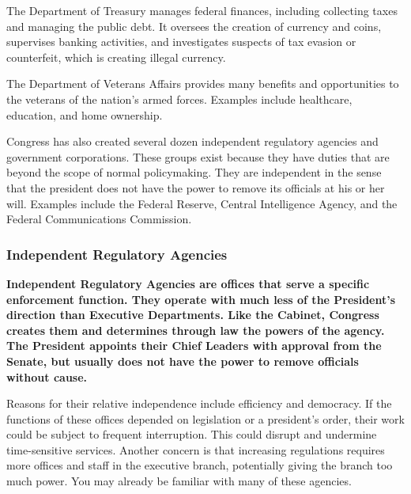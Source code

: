 \begin{definition}
    The Department of Treasury manages federal finances, including collecting
    taxes and managing the public debt. It oversees the creation of currency and
    coins, supervises banking activities, and investigates suspects of tax
    evasion or counterfeit, which is creating illegal currency.
\end{definition}

\begin{definition}
    The Department of Veterans Affairs provides many benefits and opportunities
    to the veterans of the nation's armed forces. Examples include healthcare,
    education, and home ownership.
\end{definition}

\begin{definition}
    Congress has also created several dozen independent regulatory agencies and
    government corporations. These groups exist because they have duties that
    are beyond the scope of normal policymaking. They are independent in the
    sense that the president does not have the power to remove its officials at
    his or her will. Examples include the Federal Reserve, Central Intelligence
    Agency, and the Federal Communications Commission.
\end{definition}

\subsubsection*{Independent Regulatory Agencies}

\bf{Independent Regulatory Agencies} are offices that serve a specific
enforcement function. They operate with much less of the \bf{President's}
direction than \bf{Executive Departments}. Like the \bf{Cabinet}, \bf{Congress}
creates them and determines through law the powers of the agency. The
\bf{President} appoints their \bf{Chief Leaders} with approval from the
\bf{Senate}, but usually does not have the power to remove officials without
cause.

Reasons for their relative independence include efficiency and democracy. If the
functions of these offices depended on legislation or a president's order, their
work could be subject to frequent interruption. This could disrupt and undermine
time-sensitive services. Another concern is that increasing regulations requires
more offices and staff in the executive branch, potentially giving the branch
too much power. You may already be familiar with many of these agencies.

